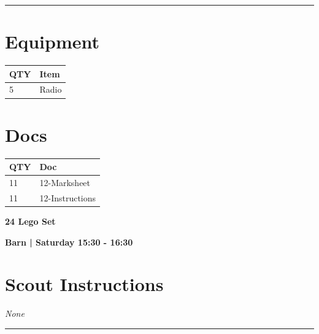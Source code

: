 \documentclass[10pt]{article}
\newcommand{\newtitle}[1]{\begin{center}{\Huge\bfseries #1 }\\ \vspace{5mm}\end{center}}
\newcommand{\newsubtitle}[1]{\begin{center}{\color{grey}\Large\bfseries #1 }\\ \vspace{5mm}\end{center}}
\begin{document}
			\vspace{0.5cm}
	\hrule
	\vspace{0.5cm}

	\begin{multicols}{2}

		\section*{\faWrench \: Equipment}

		
	\begin{center}
			\begin{tabular}{p{2cm}p{4cm}}


				\textbf{QTY} & \textbf{Item} \\\toprule
												5&Radio\\\midrule
								\end{tabular}

			\end{center}

		
		\vfill\null
		\columnbreak

			\section*{\faFile \: Docs}
		 	\begin{center}
			\begin{tabular}{p{2cm}p{4cm}}

			\textbf{QTY} & \textbf{Doc} \\\toprule
										11&12-Marksheet\\\midrule
										11&12-Instructions\\\midrule
							\end{tabular}
			\end{center}
	

		\vfill\null

		\end{multicols}



	\vspace{1cm}


	\clearpage
		\newtitle{24 Lego Set }
	\newsubtitle{Barn | Saturday 15:30 - 16:30}
		\setcounter{section}{23}
	\section*{Scout Instructions}
		\textit{None}
	
	\vspace{0.5cm}
	\hrule
	\vspace{0.5cm}
\end{document}
